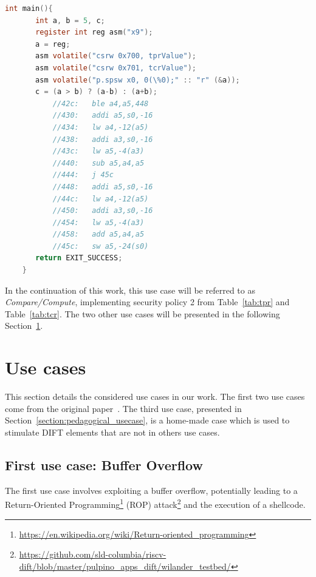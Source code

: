 \begin{lstlisting}[style=topPosition, caption=Compare/Compute C Code, language=C, label=code:compcompu]
    int main(){
       int a, b = 5, c;
       register int reg asm("x9");
       a = reg;
       asm volatile("csrw 0x700, tprValue");
       asm volatile("csrw 0x701, tcrValue");
       asm volatile("p.spsw x0, 0(\%0);" :: "r" (&a));
       c = (a > b) ? (a-b) : (a+b);
           //42c:   ble a4,a5,448
           //430:   addi a5,s0,-16
           //434:   lw a4,-12(a5)
           //438:   addi a3,s0,-16
           //43c:   lw a5,-4(a3)
           //440:   sub a5,a4,a5
           //444:   j 45c
           //448:   addi a5,s0,-16
           //44c:   lw a4,-12(a5)
           //450:   addi a3,s0,-16
           //454:   lw a5,-4(a3)
           //458:   add a5,a4,a5
           //45c:   sw a5,-24(s0)
       return EXIT_SUCCESS;
    }\end{lstlisting}

In the continuation of this work, this use case will be referred to as \textit{Compare/Compute}, implementing security policy 2 from Table~\ref{tab:tpr} and Table~\ref{tab:tcr}. The two other use cases will be presented in the following Section~\ref{section:uses_cases}.

\section{Use cases}
\label{section:uses_cases}

This section details the considered use cases in our work. The first two use cases come from the original paper~\cite{PDGLC-18-hpec}. The third use case, presented in Section~\ref{section:pedagogical_usecase}, is a home-made case which is used to stimulate DIFT elements that are not in others use cases.

\subsection{First use case: Buffer Overflow}
The first use case involves exploiting a buffer overflow, potentially leading to a Return-Oriented Programming\footnote{\url{https://en.wikipedia.org/wiki/Return-oriented_programming}\hfill} (ROP) attack\footnote{\url{https://github.com/sld-columbia/riscv-dift/blob/master/pulpino\_apps\_dift/wilander\_testbed/}} and the execution of a shellcode.

